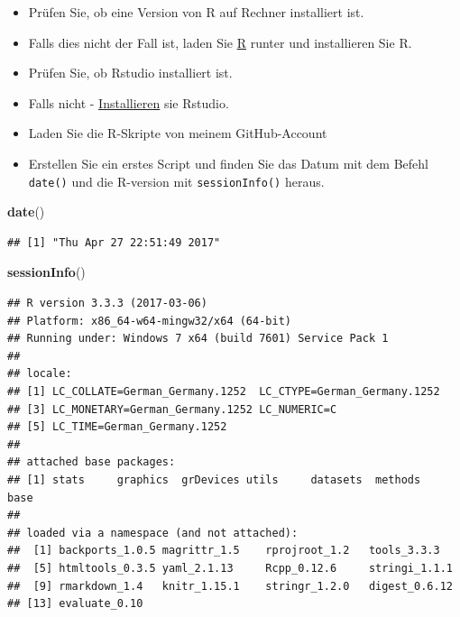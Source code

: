 \documentclass[]{article}
\newenvironment{Shaded}{\begin{snugshade}}{\end{snugshade}}
\newcommand{\KeywordTok}[1]{\textcolor[rgb]{0.13,0.29,0.53}{\textbf{{#1}}}}
\newcommand{\NormalTok}[1]{{#1}}
\providecommand{\tightlist}{%
  \setlength{\itemsep}{0pt}\setlength{\parskip}{0pt}}
\begin{document}
\begin{itemize}
\tightlist
\item
  Prüfen Sie, ob eine Version von R auf Rechner installiert ist.
\item
  Falls dies nicht der Fall ist, laden Sie \href{r-project.org}{R}
  runter und installieren Sie R.
\item
  Prüfen Sie, ob Rstudio installiert ist.
\item
  Falls nicht - \href{http://www.rstudio.com/}{Installieren} sie
  Rstudio.
\item
  Laden Sie die R-Skripte von meinem GitHub-Account
\item
  Erstellen Sie ein erstes Script und finden Sie das Datum mit dem
  Befehl \texttt{date()} und die R-version mit \texttt{sessionInfo()}
  heraus.
\end{itemize}

\begin{Shaded}
\begin{Highlighting}[]
\KeywordTok{date}\NormalTok{()}
\end{Highlighting}
\end{Shaded}

\begin{verbatim}
## [1] "Thu Apr 27 22:51:49 2017"
\end{verbatim}

\begin{Shaded}
\begin{Highlighting}[]
\KeywordTok{sessionInfo}\NormalTok{()}
\end{Highlighting}
\end{Shaded}

\begin{verbatim}
## R version 3.3.3 (2017-03-06)
## Platform: x86_64-w64-mingw32/x64 (64-bit)
## Running under: Windows 7 x64 (build 7601) Service Pack 1
## 
## locale:
## [1] LC_COLLATE=German_Germany.1252  LC_CTYPE=German_Germany.1252   
## [3] LC_MONETARY=German_Germany.1252 LC_NUMERIC=C                   
## [5] LC_TIME=German_Germany.1252    
## 
## attached base packages:
## [1] stats     graphics  grDevices utils     datasets  methods   base     
## 
## loaded via a namespace (and not attached):
##  [1] backports_1.0.5 magrittr_1.5    rprojroot_1.2   tools_3.3.3    
##  [5] htmltools_0.3.5 yaml_2.1.13     Rcpp_0.12.6     stringi_1.1.1  
##  [9] rmarkdown_1.4   knitr_1.15.1    stringr_1.2.0   digest_0.6.12  
## [13] evaluate_0.10
\end{verbatim}
\end{document}
